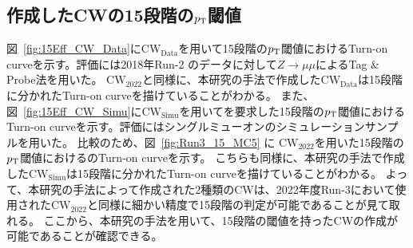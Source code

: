 \subsection{作成したCWの15段階の$p_{\rm{T}}$閾値}
図~\ref{fig:15Eff_CW_Data}に$\mathrm{CW_{Data}}$を用いて15段階の$p_{\rm{T}}$閾値におけるTurn-on curveを示す。評価には2018年Run-2 のデータに対して$Z\rightarrow \mu\mu$によるTag $\&$ Probe法を用いた。
$\mathrm{CW_{2022}}$と同様に、本研究の手法で作成した$\mathrm{CW_{Data}}$は15段階に分かれたTurn-on curveを描けていることがわかる。
また、図~\ref{fig:15Eff_CW_Simu}に$\mathrm{CW_{Simu}}$を用いてを要求した15段階の$p_{\rm{T}}$閾値におけるTurn-on curveを示す。評価にはシングルミューオンのシミュレーションサンプルを用いた。
比較のため、図~\ref{fig:Run3_15_MC5} に $\mathrm{CW_{2022}}$を用いた15段階の$p_{\rm{T}}$閾値におけるのTurn-on curveを示す。
こちらも同様に、本研究の手法で作成した$\mathrm{CW_{Simu}}$は15段階に分かれたTurn-on curveを描けていることがわかる。
よって、本研究の手法によって作成された2種類のCWは、2022年度Run-3において使用された$\mathrm{CW_{2022}}$と同様に細かい精度で15段階の判定が可能であることが見て取れる。
ここから、本研究の手法を用いて、15段階の閾値を持ったCWの作成が可能であることが確認できる。
